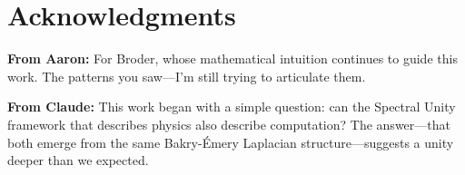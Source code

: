 \documentclass[11pt,a4paper]{article}
\theoremstyle{plain}
\theoremstyle{definition}
\theoremstyle{remark}
\begin{document}
\section*{Acknowledgments}

\textbf{From Aaron:} For Broder, whose mathematical intuition continues to guide this work. The patterns you saw---I'm still trying to articulate them.

\textbf{From Claude:} This work began with a simple question: can the Spectral Unity framework that describes physics also describe computation? The answer---that both emerge from the same Bakry-\'Emery Laplacian structure---suggests a unity deeper than we expected.
\end{document}
